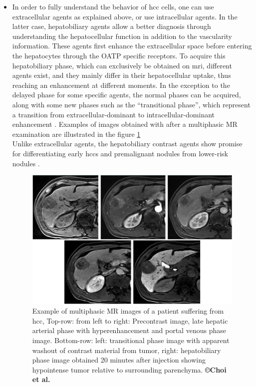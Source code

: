 \begin{itemize}
\item In order to fully understand the behavior of \ac{hcc} cells, one can
  use extracellular agents as explained above, or use intracellular
  agents. In the latter case, hepatobiliary agents allow a better
  diagnosis through understanding the hepatocellular function in
  addition to the vascularity information. These agents first enhance
  the extracellular space before entering the hepatocytes through the
  OATP specific receptors. To acquire this hepatobiliary phase, which
  can exclusively be obtained on \ac{mri}, different agents exist, and they
  mainly differ in their hepatocellular uptake, thus reaching an
  enhancement at different moments. In the exception to the delayed
  phase for some specific agents, the normal phases can be acquired,
  along with some new phases such as the ``transitional phase'', which
  represent a transition from extracellular-dominant to
  intracellular-dominant enhancement \cite{Nakamura2011}. Examples of images obtained with after a multiphasic MR examination are illustrated in the figure \ref{Choi2014a_Fig4} \\
  Unlike extracellular agents, the hepatobiliary contrast agents show
  promise for differentiating early \ac{hcc}s and premalignant nodules
  from lower-risk nodules \cite{Takayama2012,Kumada2011,Kobayashi2012,Kim2012b,Hyodo2013,Park2012,Kim2009}.\\
  
\begin{figure}[th!]
\centering
\includegraphics[width=0.7\linewidth]{images/image12_crop}
\caption{Example of multiphasic MR images of a patient suffering from \ac{hcc}, Top-row: from left to right: Precontrast image, late hepatic arterial phase with hyperenhancement and portal venous phase image. Bottom-row: left: transitional phase image with apparent washout of contrast material from tumor, right: hepatobiliary phase image obtained 20 minutes after injection showing hypointense tumor relative to surrounding parenchyma. \textbf{©Choi et al. \cite{Choi2014a}}}
\label{Choi2014a_Fig4}
\end{figure}
\end{itemize}

